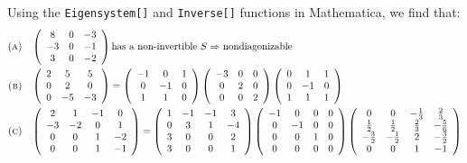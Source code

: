 \documentclass[11pt,answers]{exam}
\begin{document}
\begin{questions}
\begin{solution}
Using the \texttt{Eigensystem[]} and \texttt{Inverse[]} functions in Mathematica, we find that:
\begin{align*}
\hbox{\textsc{(a)}} \:\:\:\: &\left(\begin{array}{ccc}8 & 0 & -3 \\ -3 & 0 & -1 \\ 3 & 0 & -2 \end{array}\right) \hbox{has a non-invertible $S \Rightarrow$ nondiagonizable}\\
\hbox{\textsc{(b)}} \:\:\:\: &\left(\begin{array}{ccc} 2 & 5 & 5 \\ 0 & 2 & 0 \\ 0 & -5 & -3 \end{array} \right) = \left(\begin{array}{ccc} -1 & 0 & 1 \\ 0 & -1 & 0 \\ 1 & 1 & 0 \end{array}\right)
\left(\begin{array}{ccc} -3 & 0 & 0 \\ 0 & 2 & 0 \\ 0 & 0 & 2 \end{array}\right)
\left(\begin{array}{ccc} 0 & 1 & 1 \\ 0 & -1 & 0 \\ 1 & 1 & 1 \end{array}\right)\\
\hbox{\textsc{(c)}} \:\:\:\: &\left(\begin{array}{cccc} 2 & 1 & -1 & 0 \\ -3 & -2 & 0 & 1 \\ 0 & 0 & 1 & -2 \\ 0 & 0 & 1 & -1 \end{array}\right) = 
\left(\begin{array}{cccc} 1 & -1 & -1 & 3 \\ 0 & 3 & 1 & -4 \\ 3 & 0 & 0 & 2 \\ 3 & 0 & 0 & 1 \\ \end{array}\right)
\left(\begin{array}{cccc} -1 & 0 & 0 & 0 \\ 0 & -1 & 0 & 0 \\ 0 & 0 & 1 & 0 \\ 0 & 0 & 0 & 0 \\ \end{array} \right) 
\left(\begin{array}{cccc} 0 & 0 & -\frac{1}{3} & \frac{2}{3} \\ \frac{1}{2} & \frac{1}{2} & \frac{2}{3} & -\frac{5}{6} \\ -\frac{3}{2} & -\frac{1}{2} & 2 & -\frac{3}{2} \\ 0 & 0 & 1 & -1 \\\end{array}\right)
\end{align*}
\end{solution}


\end{questions}
\end{document}
